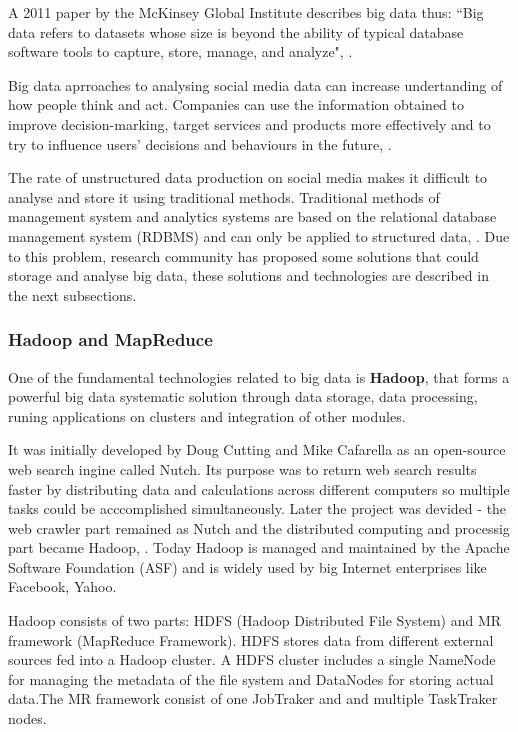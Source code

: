 A 2011 paper by the McKinsey Global Institute describes big data thus: ``Big data refers to datasets whose size is beyond the ability of typical database software tools to capture, store, manage, and analyze", \cite{bigdata}. 

Big data aprroaches to analysing social media data can increase undertanding of how people think and act. Companies can use the information obtained to improve decision-marking, target services and products more effectively and to try to influence users' decisions and behaviours in the future, \cite{POSTNOTE460}.

The rate of unstructured data production on social media makes it difficult to analyse and store it using traditional methods. Traditional methods of management system and analytics systems are based on the relational database management system (RDBMS) and can only be applied to structured data, \cite{bdtech}. Due to this problem, research community has proposed some solutions that could storage and analyse big data, these solutions and technologies are described in the next subsections.

\subsubsection{Hadoop and MapReduce}

One of the fundamental technologies related to big data is \textbf{Hadoop}, that forms a powerful big data systematic solution through data storage, data processing, runing applications on clusters and integration of other modules. 

It was initially developed by Doug Cutting and Mike Cafarella as an open-source web search ingine called Nutch. Its purpose was to return web search results faster by distributing data and calculations across different computers so multiple tasks could be acccomplished simultaneously. Later the project was devided - the web crawler part remained as Nutch and the distributed computing and processig part became Hadoop, \cite{sas}. Today Hadoop is managed and maintained by the Apache Software Foundation (ASF) and is widely used by big Internet enterprises like Facebook, Yahoo. 

Hadoop consists of two parts: HDFS (Hadoop Distributed File System) and MR framework (MapReduce Framework). HDFS stores data from different external sources fed into a Hadoop cluster. A HDFS cluster includes a single NameNode for managing the metadata of the file system and DataNodes for storing actual data.The MR framework consist of one JobTraker and and multiple TaskTraker nodes.

